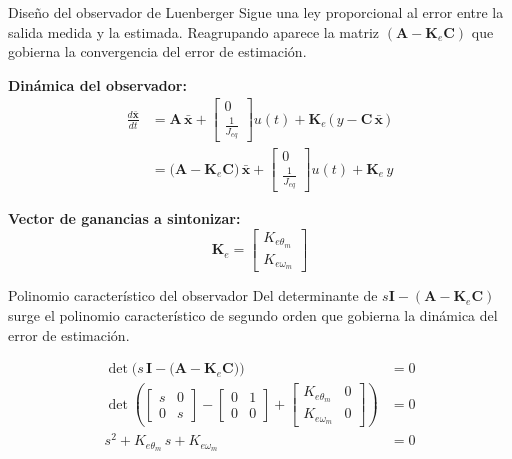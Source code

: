 \documentclass[aspectratio=169,t]{beamer}
\begin{document}
\begin{frame}{Diseño del observador de Luenberger}
{\small\color{uncGray}Sigue una ley proporcional al error entre la salida medida y la estimada. Reagrupando aparece la matriz $(\bm{A}-\bm{K}_e\bm{C})$ que gobierna la convergencia del error de estimación.}\par
\vspace{3mm}

\textbf{Dinámica del observador:}
\begin{align*}
\frac{d\bar{\bm{x}}}{dt} &= \bm{A}\,\bar{\bm{x}} + \begin{bmatrix} 0 \\ \tfrac{1}{J_{eq}} \end{bmatrix} u(t) + \bm{K}_e\,\big(\,y - \bm{C}\,\bar{\bm{x}}\,\big) \\[4pt]
&= \big(\bm{A} - \bm{K}_e\bm{C}\big)\,\bar{\bm{x}} + \begin{bmatrix} 0 \\ \tfrac{1}{J_{eq}} \end{bmatrix} u(t) + \bm{K}_e\,y
\end{align*}

\textbf{Vector de ganancias a sintonizar:}
\begin{equation*}
\bm{K}_e = \begin{bmatrix} K_{e\theta_m} \\ K_{e\omega_m} \end{bmatrix}
\end{equation*}
\end{frame}

\begin{frame}{Polinomio característico del observador}
{\small\color{uncGray}Del determinante de $s\bm{I} - (\bm{A} - \bm{K}_e\bm{C})$ surge el polinomio característico de segundo orden que gobierna la dinámica del error de estimación.}\par
\vspace{4mm}

\begin{align*}
\det\!\Big(s\,\bm{I} - \big(\bm{A} - \bm{K}_e\bm{C}\big)\Big) &= 0 \\[6pt]
\det\!\left(
\begin{bmatrix} s & 0 \\ 0 & s \end{bmatrix}
- \begin{bmatrix} 0 & 1 \\ 0 & 0 \end{bmatrix}
+ \begin{bmatrix} K_{e\theta_m} & 0 \\ K_{e\omega_m} & 0 \end{bmatrix}
\right) &= 0 \\[6pt]
s^{2} + K_{e\theta_m}\,s + K_{e\omega_m} &= 0
\end{align*}
\end{frame}
\end{document}
